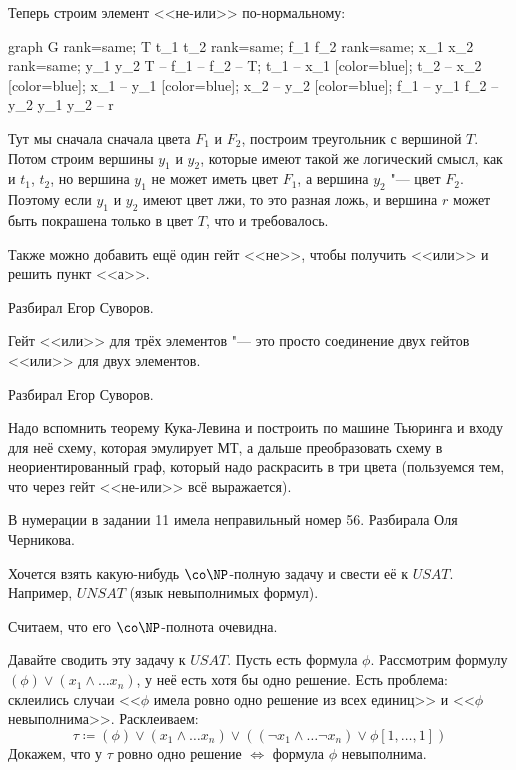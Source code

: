 	Теперь строим элемент <<не-или>> по-нормальному:
	\begin{center}
		\begin{dot2tex}[scale=0.8,options=-tmath]
			graph G {
				{rank=same; T t_1 t_2}
				{rank=same; f_1 f_2}
				{rank=same; x_1 x_2}
				{rank=same; y_1 y_2}
				T -- f_1 -- f_2 -- T;
				t_1 -- x_1 [color=blue];
				t_2 -- x_2 [color=blue];
				x_1 -- y_1 [color=blue];
				x_2 -- y_2 [color=blue];
				f_1 -- y_1
				f_2 -- y_2
				{y_1 y_2} -- r
			}
		\end{dot2tex}
	\end{center}
	Тут мы сначала сначала цвета $F_1$ и $F_2$, построим треугольник с вершиной $T$.
	Потом строим вершины $y_1$ и $y_2$, которые имеют такой же
	логический смысл, как и $t_1$, $t_2$, но вершина $y_1$ не может иметь цвет
	$F_1$, а вершина $y_2$ "--- цвет $F_2$.
	Поэтому если $y_1$ и $y_2$ имеют цвет лжи, то это разная ложь, и вершина $r$ может быть
	покрашена только в цвет $T$, что и требовалось.

	Также можно добавить ещё один гейт <<не>>, чтобы получить <<или>> и решить пункт <<а>>.

	Разбирал Егор Суворов.

	Гейт <<или>> для трёх элементов "--- это просто соединение двух гейтов <<или>> для двух элементов.

	Разбирал Егор Суворов.

	\TODO
	Надо вспомнить теорему Кука-Левина и построить по машине Тьюринга и входу для неё схему,
	которая эмулирует МТ, а дальше преобразовать схему в неориентированный граф, который надо раскрасить
	в три цвета (пользуемся тем, что через гейт <<не-или>> всё выражается).

	В нумерации в задании 11 имела неправильный номер 56.
	Разбирала Оля Черникова.

	Хочется взять какую-нибудь $\co\NP$-полную задачу и свести её к $USAT$.
	Например, $UNSAT$ (язык невыполнимых формул).
	\begin{Rem}
		Считаем, что его $\co\NP$-полнота очевидна.
		\TODO
	\end{Rem}
	Давайте сводить эту задачу к $USAT$.
	Пусть есть формула $\phi$.
	Рассмотрим формулу $(\phi) \lor (x_1 \land \dots x_n)$, у неё есть хотя бы одно решение.
	Есть проблема: склеились случаи <<$\phi$ имела ровно одно решение из всех единиц>> и <<$\phi$ невыполнима>>.
	Расклеиваем:
	\[
		\tau \coloneq (\phi) \lor (x_1 \land \dots x_n) \lor ((\lnot x_1 \land \dots \lnot x_n) \lor \phi[1, \dots, 1])
	\]
	Докажем, что у $\tau$ ровно одно решение $\iff$ формула $\phi$ невыполнима.

